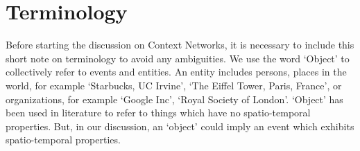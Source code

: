 \section{Terminology}
Before starting the discussion on Context Networks, it is necessary to include this short note on terminology to avoid any ambiguities. We use the word `Object' to collectively refer to events and entities. An entity includes persons, places in the world, for example `Starbucks, UC Irvine', `The Eiffel Tower, Paris, France', or organizations, for example `Google Inc', `Royal Society of London'. `Object' has been used in literature to refer to things which have no spatio-temporal properties. But, in our discussion, an `object' could imply an event which exhibits spatio-temporal properties.

